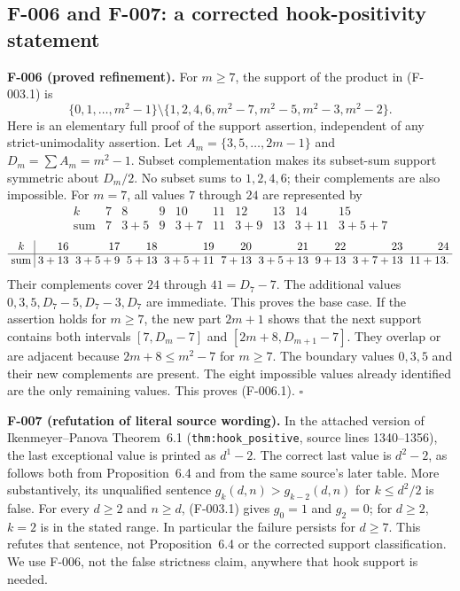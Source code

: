 \subsection{F-006 and F-007: a corrected hook-positivity statement}
\textbf{F-006 (proved refinement).}
For $m\geq7$, the support of the product in (F-003.1) is
\[
 \{0,1,\ldots,m^2-1\}\setminus
 \{1,2,4,6,m^2-7,m^2-5,m^2-3,m^2-2\}.               \tag{F-006.1}
\]
Here is an elementary full proof of the support assertion, independent of
any strict-unimodality assertion. Let $A_m=\{3,5,\ldots,2m-1\}$ and
$D_m=\sum A_m=m^2-1$. Subset complementation makes its subset-sum support
symmetric about $D_m/2$. No subset sums to $1,2,4,6$; their complements are
also impossible. For $m=7$, all values $7$ through $24$ are represented by
\[
\begin{array}{c|rrrrrrrrr}
k&7&8&9&10&11&12&13&14&15\\ \hline
\text{sum}&7&3+5&9&3+7&11&3+9&13&3+11&3+5+7
\end{array}
\]
\[
\setlength{\arraycolsep}{3pt}
\begin{array}{c|rrrrrrrrr}
k&16&17&18&19&20&21&22&23&24\\ \hline
\text{sum}&3+13&3+5+9&5+13&3+5+11&7+13&3+5+13&9+13&3+7+13&11+13.
\end{array}
\]
Their complements cover $24$ through $41=D_7-7$. The additional values
$0,3,5,D_7-5,D_7-3,D_7$ are immediate. This proves the base case.
If the assertion holds for $m\geq7$, the new part $2m+1$ shows that the next
support contains both intervals
$[7,D_m-7]$ and $[2m+8,D_{m+1}-7]$. They overlap or are adjacent because
$2m+8\leq m^2-7$ for $m\geq7$. The boundary values $0,3,5$ and their
new complements are present. The eight impossible values already identified
are the only remaining values. This proves (F-006.1). \hfill$\square$

\textbf{F-007 (refutation of literal source wording).}
In the attached version of Ikenmeyer--Panova Theorem~6.1
(\texttt{thm:hook\_positive}, source lines 1340--1356), the last exceptional
value is printed as $d^1-2$. The correct last value is $d^2-2$, as follows
both from Proposition~6.4 and from the same source's later table.
More substantively, its unqualified sentence
$g_k(d,n)>g_{k-2}(d,n)$ for $k\leq d^2/2$ is false. For every $d\geq2$ and
$n\geq d$, (F-003.1) gives $g_0=1$ and $g_2=0$; for $d\geq2$, $k=2$ is
in the stated range. In particular the failure persists for $d\geq7$.
This refutes that sentence, not Proposition~6.4 or the corrected support
classification. We use F-006, not the false strictness claim, anywhere that
hook support is needed.

